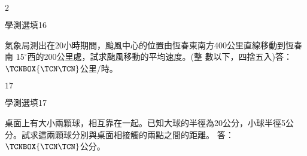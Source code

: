 \begin{QUESTIONS}
\begin{QUESTION}
\begin{QBODY}
        \end{QBODY}
        \begin{QFROMS}
        \end{QFROMS}
        \begin{QTAGS}\end{QTAGS}
        \begin{QANS}
			$2$
        \end{QANS}
        \begin{QSOLLIST}
        \end{QSOLLIST}
        \begin{QEMPTYSPACE}
        \end{QEMPTYSPACE}
    \end{QUESTION}
    \begin{QUESTION}
        \begin{ExamInfo}{89}{學測}{選填}{16}
        \end{ExamInfo}
        \begin{ExamAnsRateInfo}{}{}{}{}
        \end{ExamAnsRateInfo}
        \begin{QBODY}
		氣象局測出在20小時期間，颱風中心的位置由恆春東南方400公里直線移動到恆春南 $15^\circ$西的200公里處，試求颱風移動的平均速度。(整
數以下，四捨五入)答：$\TCNBOX{\TCN\TCN}$公里/時。

        \end{QBODY}
        \begin{QFROMS}
        \end{QFROMS}
        \begin{QTAGS}\end{QTAGS}
        \begin{QANS}
		$17$
        \end{QANS}
        \begin{QSOLLIST}
        \end{QSOLLIST}
        \begin{QEMPTYSPACE}
        \end{QEMPTYSPACE}
    \end{QUESTION}
    \begin{QUESTION}
        \begin{ExamInfo}{89}{學測}{選填}{17}
        \end{ExamInfo}
        \begin{ExamAnsRateInfo}{}{}{}{}
        \end{ExamAnsRateInfo}
        \begin{QBODY}
		桌面上有大小兩顆球，相互靠在一起。已知大球的半徑為20公分，小球半徑5公分。試求這兩顆球分別與桌面相接觸的兩點之間的距離。
答：$\TCNBOX{\TCN\TCN}$公分。


\end{QBODY}
\end{QUESTION}
\end{QUESTIONS}
